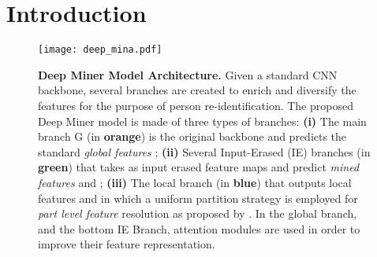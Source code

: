 \documentclass[final]{cvpr}
\begin{document}
\section{Introduction}
\begin{figure}[t!]
  \centering
  \texttt{[image: deep\_mina.pdf]}
\caption{\textbf{Deep Miner Model Architecture.} Given a standard CNN backbone, several branches are created to enrich and diversify the features for the purpose of person re-identification. The proposed Deep Miner model is made of three types of branches: \textbf{(i)} The main branch G (in {\color{Orange} \textbf{orange}}) is the original backbone and predicts the standard \textit{global features} ; \textbf{(ii)} Several Input-Erased (IE) branches (in {\color{Green} \textbf{green}}) that takes as input erased feature maps and predict \textit{mined features}  and ; \textbf{(iii)} The local branch (in {\color{Blue} \textbf{blue}}) that outputs local features  and in which a uniform partition strategy is employed for \textit{part level feature} resolution as proposed by \cite{xie2020learning}. In the global branch, and the bottom IE Branch, attention modules are used in order to  improve their feature representation.}
\label{fig:deep_mina}
\end{figure}
\end{document}

